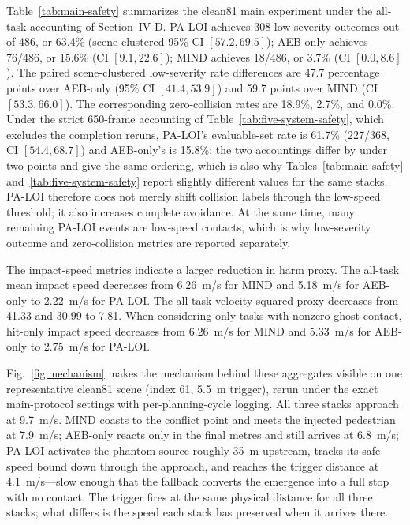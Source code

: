 \documentclass[journal]{IEEEtran}
\begin{document}
Table~\ref{tab:main-safety} summarizes the clean81 main experiment under the all-task accounting of Section~IV-D. PA-LOI achieves 308 low-severity outcomes out of 486, or 63.4\% (scene-clustered 95\% CI $[57.2, 69.5]$); AEB-only achieves 76/486, or 15.6\% (CI $[9.1, 22.6]$); MIND achieves 18/486, or 3.7\% (CI $[0.0, 8.6]$). The paired scene-clustered low-severity rate differences are 47.7 percentage points over AEB-only (95\% CI $[41.4,53.9]$) and 59.7 points over MIND (CI $[53.3,66.0]$). The corresponding zero-collision rates are 18.9\%, 2.7\%, and 0.0\%. Under the strict 650-frame accounting of Table~\ref{tab:five-system-safety}, which excludes the completion reruns, PA-LOI's evaluable-set rate is 61.7\% (227/368, CI $[54.4, 68.7]$) and AEB-only's is 15.8\%: the two accountings differ by under two points and give the same ordering, which is also why Tables~\ref{tab:main-safety} and~\ref{tab:five-system-safety} report slightly different values for the same stacks. PA-LOI therefore does not merely shift collision labels through the low-speed threshold; it also increases complete avoidance. At the same time, many remaining PA-LOI events are low-speed contacts, which is why low-severity outcome and zero-collision metrics are reported separately.

The impact-speed metrics indicate a larger reduction in harm proxy. The all-task mean impact speed decreases from \SI{6.26}{m/s} for MIND and \SI{5.18}{m/s} for AEB-only to \SI{2.22}{m/s} for PA-LOI. The all-task velocity-squared proxy decreases from 41.33 and 30.99 to 7.81. When considering only tasks with nonzero ghost contact, hit-only impact speed decreases from \SI{6.26}{m/s} for MIND and \SI{5.33}{m/s} for AEB-only to \SI{2.75}{m/s} for PA-LOI.

Fig.~\ref{fig:mechanism} makes the mechanism behind these aggregates visible on one representative clean81 scene (index 61, \SI{5.5}{m} trigger), rerun under the exact main-protocol settings with per-planning-cycle logging. All three stacks approach at \SI{9.7}{m/s}. MIND coasts to the conflict point and meets the injected pedestrian at \SI{7.9}{m/s}; AEB-only reacts only in the final metres and still arrives at \SI{6.8}{m/s}; PA-LOI activates the phantom source roughly \SI{35}{m} upstream, tracks its safe-speed bound down through the approach, and reaches the trigger distance at \SI{4.1}{m/s}---slow enough that the fallback converts the emergence into a full stop with no contact. The trigger fires at the same physical distance for all three stacks; what differs is the speed each stack has preserved when it arrives there.
\end{document}
